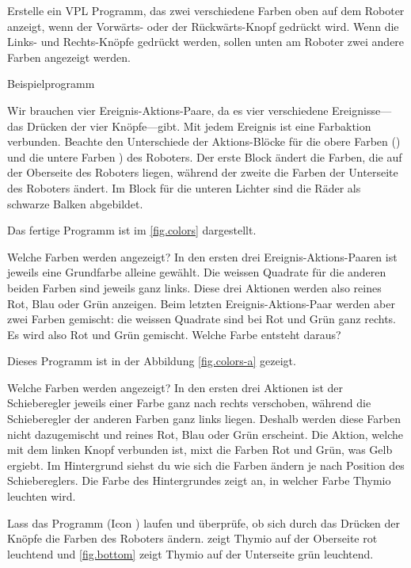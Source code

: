 

Erstelle ein VPL Programm, das zwei verschiedene Farben oben auf dem Roboter
anzeigt, wenn der Vorwärts- oder der Rückwärts-Knopf gedrückt wird. Wenn die
Links- und Rechts-Knöpfe gedrückt werden, sollen unten am Roboter zwei andere
Farben angezeigt werden.

{\raggedleft \hfill Beispielprogramm }

Wir brauchen vier Ereignis-Aktions-Paare, da es vier verschiedene
Ereignisse---das Drücken der vier Knöpfe---gibt. Mit jedem Ereignis ist eine Farbaktion verbunden. 
Beachte den Unterschiede der Aktions-Blöcke für die obere Farben () und 
die untere Farben ) des Roboters. Der erste Block ändert die Farben, die auf der Oberseite des Roboters liegen, während der zweite die Farben der Unterseite des Roboters ändert. Im Block für die unteren Lichter sind die Räder als schwarze Balken abgebildet.

Das fertige Programm ist im \cref{fig.colors} dargestellt.

Welche Farben werden angezeigt? In den ersten drei Ereignis-Aktions-Paaren ist
jeweils eine Grundfarbe alleine gewählt. Die weissen Quadrate für die anderen
beiden Farben sind jeweils ganz links. Diese drei Aktionen werden also reines
Rot, Blau oder Grün anzeigen. Beim letzten Ereignis-Aktions-Paar werden aber
zwei Farben gemischt: die weissen Quadrate sind bei Rot und Grün ganz rechts.
Es wird also Rot und Grün gemischt. Welche Farbe entsteht daraus?

Dieses Programm ist in der Abbildung \cref{fig.colors-a} gezeigt.

Welche Farben werden angezeigt? In den ersten drei Aktionen ist der Schieberegler jeweils einer Farbe ganz nach rechts verschoben, während die Schieberegler der anderen Farben ganz links liegen. Deshalb werden diese Farben nicht dazugemischt und reines Rot, Blau oder Grün erscheint.
Die Aktion, welche mit dem linken Knopf verbunden ist, mixt die Farben Rot und Grün, was Gelb ergiebt.
Im Hintergrund siehst du wie sich die Farben ändern je nach Position des Schiebereglers. Die Farbe des Hintergrundes zeigt an, in welcher Farbe Thymio leuchten wird.

Lass das Programm (Icon ) laufen und überprüfe, ob sich durch das Drücken der Knöpfe die Farben des Roboters ändern.
  zeigt Thymio auf der Oberseite rot leuchtend und \cref{fig.bottom} zeigt Thymio auf der Unterseite grün leuchtend.

